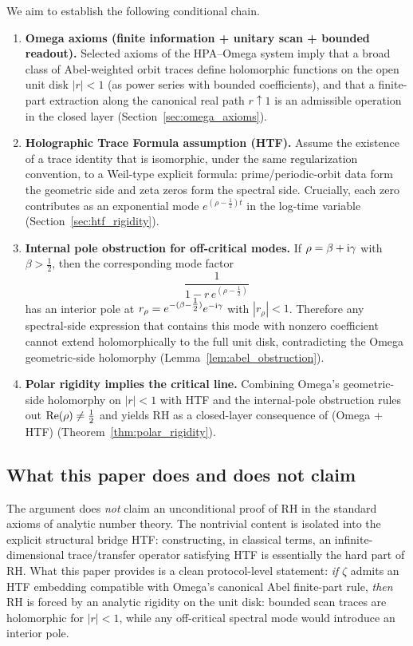 We aim to establish the following conditional chain.

\begin{enumerate}
\item \textbf{Omega axioms (finite information + unitary scan + bounded readout).}
Selected axioms of the HPA--Omega system imply that a broad class of Abel-weighted orbit traces define holomorphic functions on the open unit disk $|r|<1$ (as power series with bounded coefficients), and that a finite-part extraction along the canonical real path $r\uparrow 1$ is an admissible operation in the closed layer (Section~\ref{sec:omega_axioms}).

\item \textbf{Holographic Trace Formula assumption (HTF).}
Assume the existence of a trace identity that is isomorphic, under the same regularization convention, to a Weil-type explicit formula: prime/periodic-orbit data form the geometric side and zeta zeros form the spectral side.
Crucially, each zero contributes as an exponential mode $e^{(\rho-\tfrac{1}{2})t}$ in the log-time variable (Section~\ref{sec:htf_rigidity}).

\item \textbf{Internal pole obstruction for off-critical modes.}
If $\rho=\beta+\mathrm{i}\gamma$ with $\beta>\tfrac{1}{2}$, then the corresponding mode factor
\[
\frac{1}{1-r\,e^{(\rho-\tfrac{1}{2})}}
\]
has an interior pole at $r_\rho=e^{-(\beta-\tfrac{1}{2})}e^{-\mathrm{i}\gamma}$ with $|r_\rho|<1$.
Therefore any spectral-side expression that contains this mode with nonzero coefficient cannot extend holomorphically to the full unit disk, contradicting the Omega geometric-side holomorphy (Lemma~\ref{lem:abel_obstruction}).

\item \textbf{Polar rigidity implies the critical line.}
Combining Omega's geometric-side holomorphy on $|r|<1$ with HTF and the internal-pole obstruction rules out $\operatorname{Re}(\rho)\neq\tfrac{1}{2}$ and yields RH as a closed-layer consequence of (Omega + HTF) (Theorem~\ref{thm:polar_rigidity}).
\end{enumerate}

\subsection{What this paper does and does not claim}
\label{sec:intro_scope}

The argument does \emph{not} claim an unconditional proof of RH in the standard axioms of analytic number theory.
The nontrivial content is isolated into the explicit structural bridge HTF: constructing, in classical terms, an infinite-dimensional trace/transfer operator satisfying HTF is essentially the hard part of RH.
What this paper provides is a clean protocol-level statement:
\emph{if} $\zeta$ admits an HTF embedding compatible with Omega's canonical Abel finite-part rule, \emph{then} RH is forced by an analytic rigidity on the unit disk: bounded scan traces are holomorphic for $|r|<1$, while any off-critical spectral mode would introduce an interior pole.

